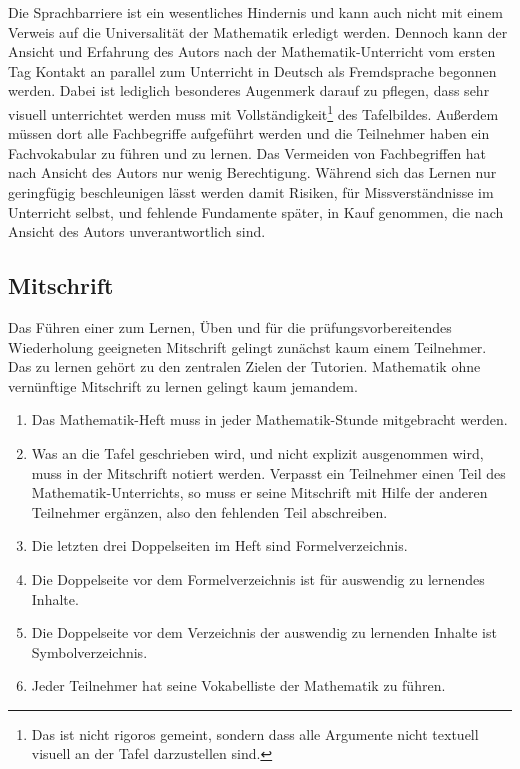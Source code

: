 \documentclass[a4paper]{book}%
\theoremstyle{definition}
\begin{document}
Die Sprachbarriere ist ein wesentliches Hindernis und kann auch nicht mit einem Verweis auf die Universalität der Mathematik erledigt werden. Dennoch kann der Ansicht und Erfahrung des Autors nach der Mathematik-Unterricht vom ersten Tag Kontakt an parallel zum Unterricht in Deutsch als Fremdsprache begonnen werden. Dabei ist lediglich besonderes Augenmerk darauf zu pflegen, dass sehr visuell unterrichtet werden muss mit Vollständigkeit\footnote{Das ist nicht rigoros gemeint, sondern dass alle Argumente nicht textuell visuell an der Tafel darzustellen sind.} des Tafelbildes. Außerdem müssen dort alle Fachbegriffe aufgeführt werden und die Teilnehmer haben ein Fachvokabular zu führen und zu lernen. Das Vermeiden von Fachbegriffen hat nach Ansicht des Autors nur wenig Berechtigung. Während sich das Lernen nur geringfügig beschleunigen lässt werden damit Risiken, für Missverständnisse im Unterricht selbst, und fehlende Fundamente später, in Kauf genommen, die nach Ansicht des Autors unverantwortlich sind.


\subsection{Mitschrift}

Das Führen einer zum Lernen, Üben und für die prüfungsvorbereitendes Wiederholung geeigneten Mitschrift gelingt zunächst kaum einem Teilnehmer. Das zu lernen gehört zu den zentralen Zielen der Tutorien. Mathematik ohne vernünftige Mitschrift zu lernen gelingt kaum jemandem.

\begin{enumerate}
  \item Das Mathematik-Heft muss in jeder Mathematik-Stunde mitgebracht werden.
  \item Was an die Tafel geschrieben wird, und nicht explizit ausgenommen wird, muss in der Mitschrift notiert werden. Verpasst ein Teilnehmer einen Teil des Mathematik-Unterrichts, so muss er seine Mitschrift mit Hilfe der anderen Teilnehmer ergänzen, also den fehlenden Teil abschreiben.
  \item Die letzten drei Doppelseiten im Heft sind Formelverzeichnis.
  \item Die Doppelseite vor dem Formelverzeichnis ist für auswendig zu lernendes Inhalte.
  \item Die Doppelseite vor dem Verzeichnis der auswendig zu lernenden Inhalte ist Symbolverzeichnis.
  \item Jeder Teilnehmer hat seine Vokabelliste der Mathematik zu führen.
\end{enumerate}
\end{document}
